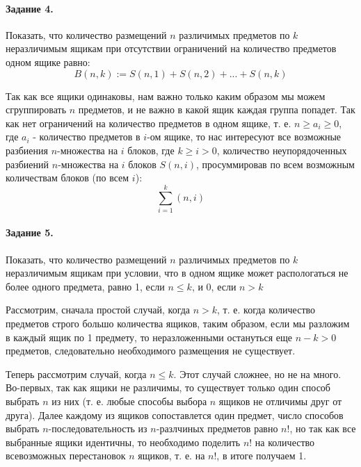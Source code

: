 \documentclass[a4paper,12pt]{article}
\begin{document}
\paragraph{Задание 4.} Показать, что количество размещений $n$ различимых предметов по $k$ неразличимым ящикам при отсутствии ограничений на количество предметов  одном ящике равно:
\[
	B\left(n,k\right) := S\left(n,1\right) + S\left(n,2\right) + ... + S \left(n,k\right)
\]
\begin{Proof}
Так как все ящики одинаковы, нам важно только каким образом мы можем сгруппировать $n$ предметов, и не важно в какой ящик каждая группа попадет. Так как нет ограничений на количество предметов в одном ящике, т. е. $n \ge a_i \ge 0$, где $a_i$ - количество предметов в $i$-ом ящике, то нас интересуют все возможные разбиения $n$-множества на $i$ блоков, где $k \ge i > 0$, количество неупорядоченных разбиений $n$-множества на $i$ блоков $S\left(n,i\right)$, просуммировав по всем возможным количествам блоков (по всем $i$):
\[
	\sum_{i=1}^{k} \left(n,i\right)
\]
\end{Proof}

\paragraph{Задание 5.} Показать, что количество размещений $n$ различимых предметов по $k$ неразличимым ящикам при условии, что в одном ящике может распологаться не более одного предмета, равно 1, если $n \le k$, и 0, если $n > k$

\begin{Proof}
Рассмотрим, сначала простой случай, когда $n>k$, т. е. когда количество предметов строго большо количества ящиков, таким образом, если мы разложим в каждый ящик по 1 предмету, то неразложенными остануться еще $n-k > 0$ предметов, следовательно необходимого размещения не существует.

Теперь рассмотрим случай, когда $n \le k$. Этот случай сложнее, но не на много. Во-первых, так как ящики не различимы, то существует только один способ выбрать $n$ из них (т. е. любые способы выбора $n$ ящиков не отличимы друг от друга). Далее каждому из ящиков сопоставлется один предмет, число способов выбрать $n$-последовательность из $n$-разлчиных предметов равно $n!$, но так как все выбранные ящики идентичны, то необходимо поделить $n!$ на количество всевозможных перестановок $n$ ящиков, т. е. на $n!$, в итоге получаем 1.
\end{Proof}
\end{document}
